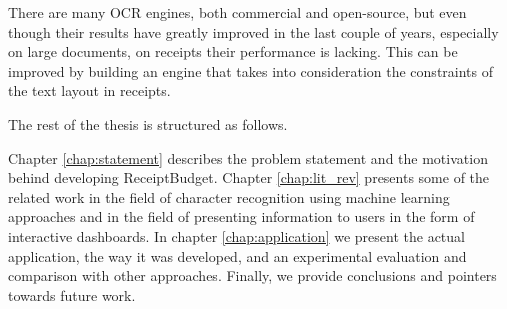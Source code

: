 There are many OCR engines, both commercial and open-source, but even though their results have greatly improved in the last couple of years, especially on large documents, on receipts their performance is lacking. This can be improved by building an engine that takes into consideration the constraints of the text layout in receipts. 

The rest of the thesis is structured as follows.

Chapter \ref{chap:statement} describes the problem statement and the motivation behind developing ReceiptBudget. Chapter \ref{chap:lit_rev} presents some of the related work in the field of character recognition using machine learning approaches and in the field of presenting information to users in the form of interactive dashboards. In chapter \ref{chap:application} we present the actual application, the way it was developed, and an experimental evaluation and comparison with other approaches. Finally, we provide conclusions and pointers towards future work. 